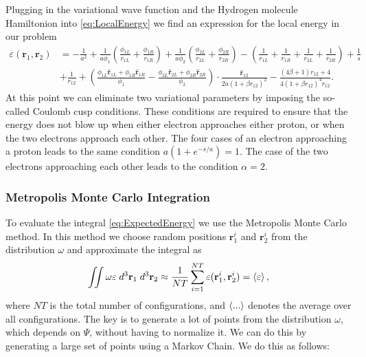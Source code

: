 \documentclass[twoside]{article}
\newcommand{\bfr}{\ensuremath{\mathbf{r}}}
\begin{document}
Plugging in the variational wave function and the Hydrogen molecule Hamiltonion into \eqref{eq:LocalEnergy} we find an expression for the local energy in our problem
\begin{equation}
\begin{split}
\varepsilon(\bfr_1,\bfr_2) &= 
-\frac{1}{a^2} 
+ \frac{1}{a\phi_1} \left(\frac{\phi_{1L}}{r_{1L}} + \frac{\phi_{1R}}{r_{1R}}\right) 
+ \frac{1}{a\phi_2} \left(\frac{\phi_{2L}}{r_{2L}} + \frac{\phi_{2R}}{r_{2R}}\right)
- \left( \frac{1}{r_{1L}}+\frac{1}{r_{1R}}+\frac{1}{r_{2L}}+\frac{1}{r_{2R}} \right) + \frac{1}{s} \\
&+ \frac{1}{r_{12}} 
+ \left( \frac{\phi_{1L}\hat{\bfr}_{1L} + \phi_{1R}\hat{\bfr}_{1R}}{\phi_1} - \frac{\phi_{2L}\hat{\bfr}_{2L} + \phi_{2R}\hat{\bfr}_{2R}}{\phi_2} \right) \cdot \frac{\hat{\bfr}_{12}}{2a(1+\beta r_{12})^2} 
- \frac{(4\beta+1)r_{12}+4}{4(1+\beta r_{12})^4 r_{12}}. 
\end{split}
\end{equation}
At this point we can eliminate two variational parameters by imposing the so-called Coulomb cusp conditions. These conditions are required to ensure that the energy does not blow up when either electron approaches either proton, or when the two electrons approach each other. The four cases of an electron approaching a proton leads to the same condition $a(1+e^{-s/a}) = 1$. The case of the two electrons approaching each other leads to the condition $\alpha = 2$.

\subsubsection*{Metropolis Monte Carlo Integration}
To evaluate the integral \eqref{eq:ExpectedEnergy} we use the Metropolis Monte Carlo method. In this method we choose random positions $\bfr_1^i$ and $\bfr_2^i$ from the distribution $\omega$ and approximate the integral as
\begin{equation}
\iint \omega \varepsilon \; d^3\bfr_1 \; d^3\bfr_2 \approx \frac{1}{NT} \sum_{i=1}^{NT} \varepsilon(\bfr_1^i,\bfr_2^i) = \braket{\varepsilon},
\end{equation}
where $NT$ is the total number of configurations, and $\braket{...}$ denotes the average over all configurations. The key is to generate a lot of points from the distribution $\omega$, which depends on $\Psi$, without having to normalize it. We can do this by generating a large set of points using a Markov Chain. We do this as follows:
\end{document}
